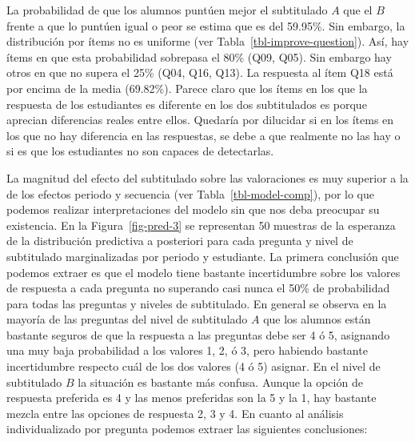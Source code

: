 \documentclass[
  12pt,
  a4paper,
  extrafontsizes,
  onecolumn,
  openright,
  table]{memoir}
\begin{document}
La probabilidad de que los alumnos puntúen mejor el subtitulado \(A\)
que el \(B\) frente a que lo puntúen igual o peor se estima que es del
59.95\%. Sin embargo, la distribución por ítems no es uniforme (ver
Tabla~\ref{tbl-improve-question}). Así, hay ítems en que esta
probabilidad sobrepasa el 80\% (Q09, Q05). Sin embargo hay otros en que
no supera el 25\% (Q04, Q16, Q13). La respuesta al ítem Q18 está por
encima de la media (69.82\%). Parece claro que los ítems en los que la
respuesta de los estudiantes es diferente en los dos subtitulados es
porque aprecian diferencias reales entre ellos. Quedaría por dilucidar
si en los ítems en los que no hay diferencia en las respuestas, se debe
a que realmente no las hay o si es que los estudiantes no son capaces de
detectarlas.

La magnitud del efecto del subtitulado sobre las valoraciones es muy
superior a la de los efectos periodo y secuencia (ver
Tabla~\ref{tbl-model-comp}), por lo que podemos realizar
interpretaciones del modelo sin que nos deba preocupar su existencia. En
la Figura~\ref{fig-pred-3} se representan 50 muestras de la esperanza de
la distribución predictiva a posteriori para cada pregunta y nivel de
subtitulado marginalizadas por periodo y estudiante. La primera
conclusión que podemos extraer es que el modelo tiene bastante
incertidumbre sobre los valores de respuesta a cada pregunta no
superando casi nunca el 50\% de probabilidad para todas las preguntas y
niveles de subtitulado. En general se observa en la mayoría de las
preguntas del nivel de subtitulado \(A\) que los alumnos están bastante
seguros de que la respuesta a las preguntas debe ser 4 ó 5, asignando
una muy baja probabilidad a los valores 1, 2, ó 3, pero habiendo
bastante incertidumbre respecto cuál de los dos valores (4 ó 5) asignar.
En el nivel de subtitulado \(B\) la situación es bastante más confusa.
Aunque la opción de respuesta preferida es 4 y las menos preferidas son
la 5 y la 1, hay bastante mezcla entre las opciones de respuesta 2, 3 y
4. En cuanto al análisis individualizado por pregunta podemos extraer
las siguientes conclusiones:
\end{document}

